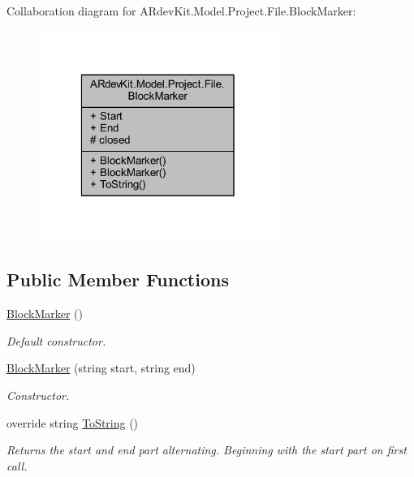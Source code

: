 Collaboration diagram for A\-Rdev\-Kit.\-Model.\-Project.\-File.\-Block\-Marker\-:
\nopagebreak
\begin{figure}[H]
\begin{center}
\leavevmode
\includegraphics[width=220pt]{class_a_rdev_kit_1_1_model_1_1_project_1_1_file_1_1_block_marker__coll__graph}
\end{center}
\end{figure}
\subsection*{Public Member Functions}
\begin{DoxyCompactItemize}
\item 
\hyperlink{class_a_rdev_kit_1_1_model_1_1_project_1_1_file_1_1_block_marker_a148e8916c49f13adff386c50d0b45738}{Block\-Marker} ()
\begin{DoxyCompactList}\small\item\em Default constructor. \end{DoxyCompactList}\item 
\hyperlink{class_a_rdev_kit_1_1_model_1_1_project_1_1_file_1_1_block_marker_aa9b3cdf82da639e651b73eff5ec7938f}{Block\-Marker} (string start, string end)
\begin{DoxyCompactList}\small\item\em Constructor. \end{DoxyCompactList}\item 
override string \hyperlink{class_a_rdev_kit_1_1_model_1_1_project_1_1_file_1_1_block_marker_a5334b9dcd41a81ccac65d7c98062c43a}{To\-String} ()
\begin{DoxyCompactList}\small\item\em Returns the start and end part alternating. Beginning with the start part on first call.\end{DoxyCompactList}\end{DoxyCompactItemize}
